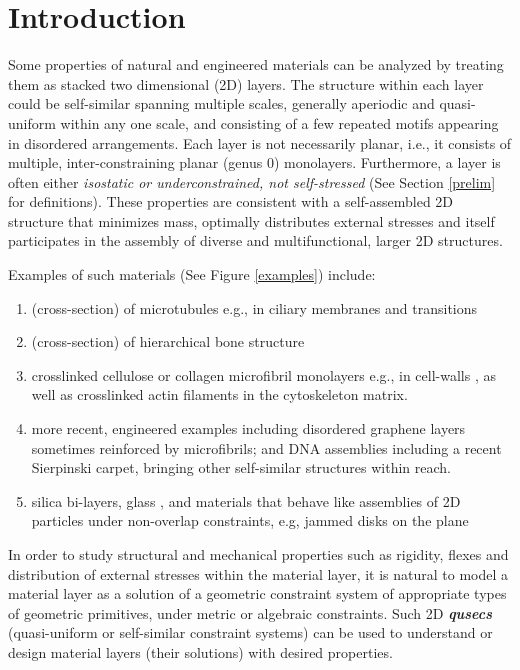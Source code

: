 \section{Introduction}
\label{sec:prev}

Some properties of natural and engineered materials can be analyzed  by
treating them as stacked two dimensional (2D) layers.
The structure within each layer could be
self-similar \cite{Intro1}
spanning multiple scales,
generally aperiodic and quasi-uniform within any one scale,
and consisting of a few repeated motifs appearing in disordered
arrangements. Each layer is not necessarily planar, i.e.,
it consists of multiple,
inter-constraining planar (genus 0) monolayers.
Furthermore, a layer is often  either
{\sl isostatic or underconstrained, not
self-stressed} (See Section \ref{prelim} for definitions).
These properties are
consistent with a self-assembled 2D structure that minimizes mass,
optimally distributes external stresses and itself
participates in the assembly of diverse and multifunctional,
larger 2D structures.

Examples of such materials (See Figure \ref{examples}) include:

\begin{enumerate}
    \item (cross-section) of microtubules \cite{Necklace1} e.g., in
ciliary membranes and transitions \cite{Necklace2}
    \item (cross-section) of hierarchical bone structure \cite{XX} %
    \item crosslinked cellulose or collagen microfibril monolayers e.g.,
in cell-walls \cite{CellWalls1} \cite{CellWalls1}, as well as crosslinked
actin filaments in the cytoskeleton matrix.
    \item more recent, engineered examples including  disordered graphene
layers \cite{Graphene1} \cite{Graphene2} sometimes reinforced
    by  microfibrils; and DNA assemblies \cite{Microfibrils1} including a
recent Sierpinski carpet, bringing other self-similar structures
    \cite{Microfibrils2} within reach.
    \item  silica bi-layers, glass \cite{SilicaGlass1}
\cite{SilicaGlass2}, and materials that behave like assemblies of
    2D particles under non-overlap constraints, e.g, jammed
    disks on the plane \cite{JammedDisk1}
%
\end{enumerate}
%
In order to study structural and mechanical properties
such as rigidity, flexes and distribution of external stresses
within the material layer, it is natural to model a material
layer as a solution of a geometric constraint system
of appropriate types of geometric primitives, under
metric or algebraic constraints.
Such  2D {\bf{\em qusecs}} (quasi-uniform or self-similar
constraint systems) can be used to
understand or design material layers (their solutions)
with desired properties.
%

